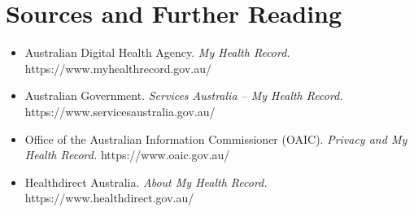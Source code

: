 \section*{Sources and Further Reading}
\begin{itemize}
    \item Australian Digital Health Agency. \textit{My Health Record.} https://www.myhealthrecord.gov.au/
    \item Australian Government. \textit{Services Australia -- My Health Record.} https://www.servicesaustralia.gov.au/
    \item Office of the Australian Information Commissioner (OAIC). \textit{Privacy and My Health Record.} https://www.oaic.gov.au/
    \item Healthdirect Australia. \textit{About My Health Record.} https://www.healthdirect.gov.au/
\end{itemize}

\clearpage
